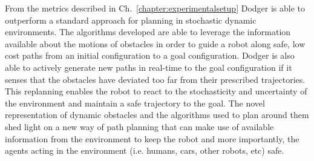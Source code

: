 \documentclass[letterpaper, 10pt, conference]{ieeeconf}
\begin{document}
From the metrics described in Ch.~\ref{chapter:experimentalsetup} Dodger is
able to outperform a standard approach for planning in stochastic dynamic
environments. The algorithms developed are able to leverage the information
available about the motions of obstacles in order to guide a robot along safe,
low cost paths from an initial configuration to a goal configuration. Dodger is
also able to actively generate new paths in real-time to the goal configuration
if it senses that the obstacles have deviated too far from their prescribed
trajectories. This replanning enables the robot to react to the stochasticity
and uncertainty of the environment and maintain a safe trajectory to the goal.
The novel representation of dynamic obstacles and the algorithms used to plan
around them shed light on a new way of path planning that can make use of
available information from the environment to keep the robot and more
importantly, the agents acting in the environment (i.e. humans, cars, other
robots, etc) safe.




\end{document}
